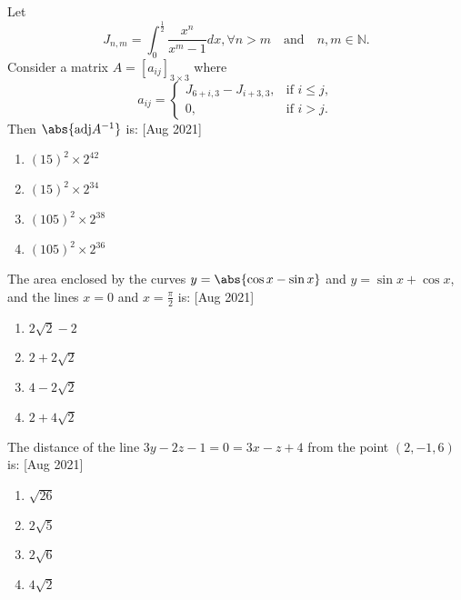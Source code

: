     \item Let 
    $$
    J_{n,m} = \int_0^\frac{1}{2} \frac{x^n}{x^m-1} dx, \forall n > m \quad \text{and} \quad n, m \in \mathbb{N}.
    $$
    Consider a matrix $A = [a_{ij}]_{3 \times 3}$ where 
    $$
    a_{ij} = \begin{cases} 
    J_{6+i,3} - J_{i+3,3}, & \text{if } i \leq j, \\
    0, & \text{if } i > j.
    \end{cases}
    $$
    Then $\abs{\text{adj} A^{-1}}$ is: \hfill [Aug 2021]
    \begin{multicols}{4}
        \begin{enumerate}
            \item $(15)^2 \times 2^{42}$
            \item $(15)^2 \times 2^{34}$
            \item $(105)^2 \times 2^{38}$
            \item $(105)^2 \times 2^{36}$
        \end{enumerate}
    \end{multicols}

    \item The area enclosed by the curves $y = \abs{\cos x - \sin x}$ and $y = \sin x + \cos x$, and the lines $x = 0$ and $x = \frac{\pi}{2}$ is: \hfill [Aug 2021]
    \begin{multicols}{4}
        \begin{enumerate}
            \item $2\sqrt{2} - 2$
            \item $2 + 2\sqrt{2}$
            \item $4 - 2\sqrt{2}$
            \item $2 + 4\sqrt{2}$
        \end{enumerate}
    \end{multicols}

    \item The distance of the line $3y - 2z - 1 = 0 = 3x - z + 4$ from the point $(2, -1, 6)$ is: \hfill [Aug 2021]
    \begin{multicols}{4}
        \begin{enumerate}
            \item $\sqrt{26}$
            \item $2\sqrt{5}$
            \item $2\sqrt{6}$
            \item $4\sqrt{2}$
        \end{enumerate}
    \end{multicols}

